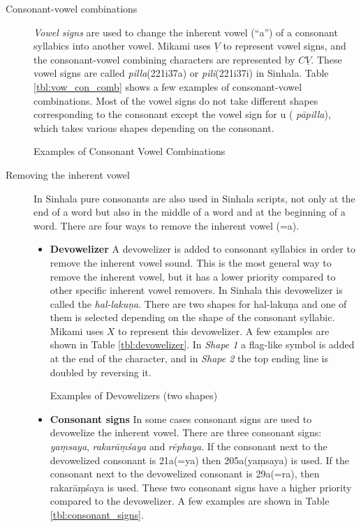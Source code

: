 \documentclass[english]{jnlp_1.3e}
\begin{document}
\begin{description}
\item[Consonant-vowel combinations]
 {\it Vowel signs}   are used to change the inherent vowel (``a'') of a  consonant syllabics  into another vowel. 
Mikami uses $\underline{V}$ to represent vowel signs, 
and the  consonant-vowel combining characters  are represented by $C\underline{V}$.
These vowel signs are called  {\it pilla}({\SHa\char221i}{\SHb{}}{\SHb\char37a}) or  {\it pili}({\SHa\char221i}{\SHb\char37i}) in Sinhala.
Table \ref{tbl:vow_con_comb} shows a few examples of consonant-vowel combinations. 
Most of the vowel signs do not take different shapes corresponding to the consonant except the  vowel sign for u ( {\it p\={a}pilla}),
which takes various shapes depending on the consonant.

\begin{table}[t]
\caption{Examples of Consonant Vowel Combinations} 
\label{tbl:vow_con_comb}

\end{table}

\item[Removing the inherent vowel]
In Sinhala pure consonants are also used in Sinhala scripts, not only at the end of a word but  also in the middle of a word and at  the beginning of a word. There are four ways to remove the inherent vowel {\SHa{}}(=a). 
\begin{itemize}
\item \textbf{Devowelizer}
 A devowelizer  is added to  consonant syllabics  in order to remove the inherent vowel sound. 
This is the most  general  way to remove the inherent vowel, but it has a  lower priority compared to other specific  inherent vowel removers.
 In Sinhala this  devowelizer  is called the {\it hal-laku\d{n}a}. 
There are two shapes for   hal-laku\d{n}a  and one of them is selected depending on the shape of the   consonant syllabic. 
Mikami uses $X$ to represent this  devowelizer.
A few examples are shown in Table \ref{tbl:devowelizer}.
In  {\it Shape 1}  a flag-like symbol is added at the end of the character,
and in  {\it Shape 2}  the top ending line is doubled by reversing it.

\begin{table}[b]
\caption{Examples of Devowelizers (two shapes)} 
\label{tbl:devowelizer}

\end{table}

\item \textbf{Consonant signs}
In some cases   consonant signs  are used to devowelize the inherent vowel. 
There are three  consonant signs:  {\it ya\d{m}saya},  {\it rakar\={a}\d{m}\'{s}aya } and  {\it r\={e}phaya}.
If the consonant next to the devowelized consonant is {\SHb\char21a}(=ya) then {\SHb\char205a}(ya\d{m}saya) is used. 
If the consonant next to the devowelized consonant is {\SHb\char29a}(=ra), then  rakar\={a}\d{m}\'{s}aya is used. 
These two  consonant signs  have a higher priority compared to  the  devowelizer.
A few examples are shown in Table \ref{tbl:consonant_signs}.


\end{itemize}
\end{description}
\end{document}
